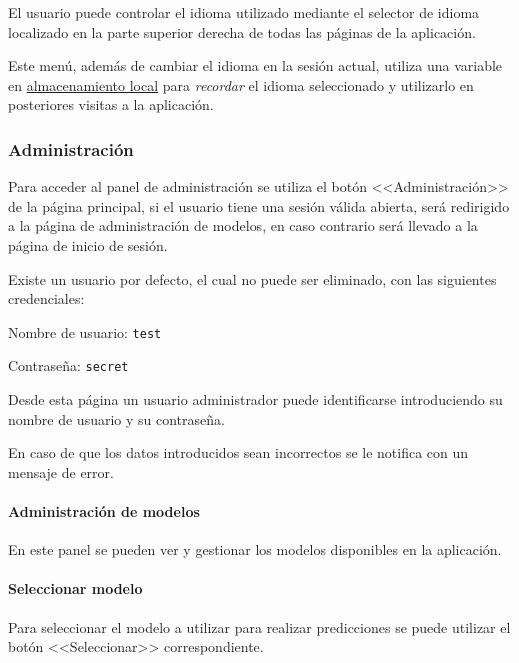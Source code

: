 El usuario puede controlar el idioma utilizado mediante el selector de idioma
localizado en la parte superior derecha de todas las páginas de la aplicación.


Este menú, además de cambiar el idioma en la sesión actual, utiliza una variable
en
\href{https://developer.mozilla.org/es/docs/Web/API/Window/localStorage}{almacenamiento
local} para \textit{recordar} el idioma seleccionado y utilizarlo en posteriores
visitas a la aplicación.

\subsubsection{Administración}

Para acceder al panel de administración se utiliza el botón <<Administración>>
de la página principal, si el usuario tiene una sesión válida abierta, será
redirigido a la página de administración de modelos, en caso contrario será
llevado a la página de inicio de sesión.

Existe un usuario por defecto, el cual no puede ser eliminado, con las
siguientes credenciales:

Nombre de usuario: \texttt{test}

Contraseña: \texttt{secret}


Desde esta página un usuario administrador puede identificarse introduciendo su
nombre de usuario y su contraseña.

En caso de que los datos introducidos sean incorrectos se le notifica con un
mensaje de error.


\paragraph{Administración de modelos}

En este panel se pueden ver y gestionar los modelos disponibles en la
aplicación.

\paragraph{Seleccionar modelo}

Para seleccionar el modelo a utilizar para realizar predicciones se puede
utilizar el botón <<Seleccionar>> correspondiente.

